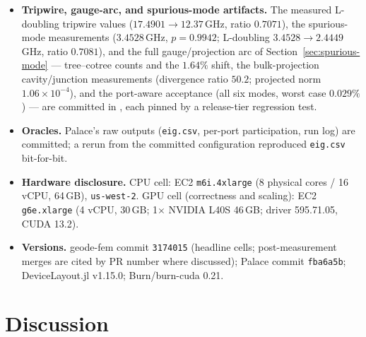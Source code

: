 \documentclass{anvil-paper}
\begin{document}
\begin{itemize}
    (per-run wall clocks, peak RSS, instance and software provenance) is
    committed as . The
    complete GPU driven-solve scaling cell (all sixteen configuration
    $\times$ size cells, iteration counts, recomputed true residuals,
    accuracy-versus-Direct columns, DNF/flaky handling, and same-host
    provenance) is committed as
    .
  \item \textbf{Tripwire, gauge-arc, and spurious-mode artifacts.} The
    measured L-doubling tripwire values ($17.4901 \to 12.37$\,GHz, ratio
    $0.7071$), the spurious-mode measurements ($3.4528$\,GHz,
    $p = 0.9942$; L-doubling $3.4528 \to 2.4449$\,GHz, ratio $0.7081$),
    and the full gauge/projection arc of
    Section~\ref{sec:spurious-mode} --- tree--cotree counts and the
    $1.64\%$ shift, the bulk-projection cavity/junction measurements
    (divergence ratio $50.2$; projected norm $1.06\times10^{-4}$), and
    the port-aware acceptance (all six modes, worst case $0.029\%$) ---
    are committed in , each
    pinned by a release-tier regression test.
  \item \textbf{Oracles.} Palace's raw outputs (\texttt{eig.csv},
    per-port participation, run log) are committed; a rerun from the
    committed configuration reproduced \texttt{eig.csv} bit-for-bit.
  \item \textbf{Hardware disclosure.} CPU cell: EC2 \texttt{m6i.4xlarge}
    (8 physical cores / 16 vCPU, 64\,GB), \texttt{us-west-2}. GPU cell
    (correctness and scaling): EC2 \texttt{g6e.xlarge} (4 vCPU, 30\,GB;
    1$\times$ NVIDIA L40S 46\,GB; driver 595.71.05, CUDA 13.2).
  \item \textbf{Versions.} geode-fem commit \texttt{3174015} (headline
    cells; post-measurement merges are cited by PR number where
    discussed); Palace commit \texttt{fba6a5b}; DeviceLayout.jl v1.15.0;
    Burn/burn-cuda 0.21.
\end{itemize}

\section{Discussion}
\label{sec:discussion}
\end{document}
